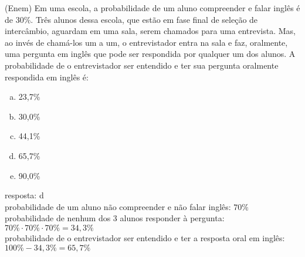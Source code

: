 \begin{ex}
   (Enem)  Em uma escola, a probabilidade de um aluno compreender e falar inglês é de 30\%. Três alunos dessa escola, que estão em fase final de seleção de  intercâmbio, aguardam em uma sala, serem chamados para uma entrevista. Mas, ao invés de chamá-los um a um, o entrevistador entra na sala e faz, oralmente, uma pergunta em inglês que pode ser respondida por qualquer um dos alunos. A probabilidade de o entrevistador ser entendido e ter sua pergunta oralmente respondida em inglês é:
     \begin{enumerate} [(a)]
         \item 23,7\%
         \item 30,0\%
         \item 44,1\%
         \item 65,7\%
         \item 90,0\%
     \end{enumerate}
       \begin{sol}
        resposta: d \\
        probabilidade de um aluno não compreender e não falar inglês: $70\%$ \\
        probabilidade de nenhum dos 3 alunos responder à pergunta: $70\%\cdot70\%\cdot70\%=34,3\%$ \\
        probabilidade de o entrevistador ser entendido e ter a resposta oral em inglês:
        $100\%-34,3\%=65,7\%$
       \end{sol}
  \end{ex}